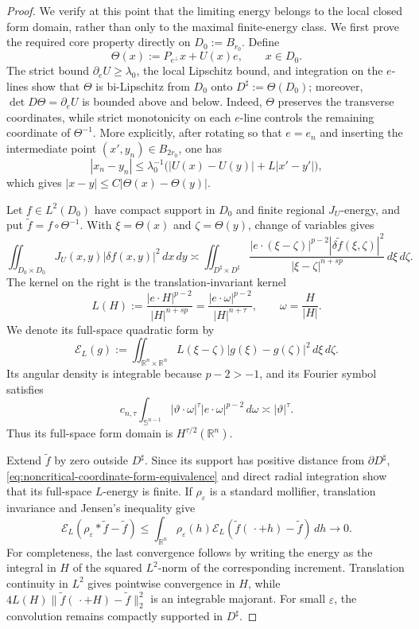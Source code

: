 \documentclass[10pt,a4paper]{amsart}
\newcommand{\R}{\mathbb R}
\newcommand{\dd}{\,d}
\begin{document}
\begin{proof}
We verify at this point that the limiting energy belongs to the local
closed form domain, rather than only to the maximal finite-energy
class.  We first prove the required core property directly on
\(D_0:=B_{r_0}\).  Define
\[
 \Theta(x):=P_{e^\perp}x+U(x)e,
 \qquad x\in D_0.
\]
The strict bound \(\partial_eU\ge\lambda_0\), the local Lipschitz
bound, and integration on the \(e\)-lines show that \(\Theta\) is
bi-Lipschitz from \(D_0\) onto \(D^\sharp:=\Theta(D_0)\); moreover,
\(\det D\Theta=\partial_eU\) is bounded above and below.  Indeed,
\(\Theta\) preserves the transverse coordinates, while strict
monotonicity on each \(e\)-line controls the remaining coordinate of
\(\Theta^{-1}\).  More explicitly, after rotating so that \(e=e_n\)
and inserting the intermediate point \((x',y_n)\in B_{2r_0}\), one has
\[
 |x_n-y_n|\le\lambda_0^{-1}
 \bigl(|U(x)-U(y)|+L|x'-y'|\bigr),
\]
which gives \(|x-y|\le C|\Theta(x)-\Theta(y)|\).

Let \(f\in L^2(D_0)\) have compact support in \(D_0\) and finite
regional \(J_U\)-energy, and put
\(\widetilde f=f\circ\Theta^{-1}\).  With
\(\xi=\Theta(x)\) and \(\zeta=\Theta(y)\), change of variables gives
\begin{equation}
 \iint_{D_0\times D_0}J_U(x,y)|\delta f(x,y)|^2\dd x\!\dd y
 \asymp
 \iint_{D^\sharp\times D^\sharp}
 \frac{|e\cdot(\xi-\zeta)|^{p-2}
       |\delta\widetilde f(\xi,\zeta)|^2}
 {|\xi-\zeta|^{n+sp}}\dd\xi\!\dd\zeta.
 \label{eq:noncritical-coordinate-form-equivalence}
\end{equation}
The kernel on the right is the translation-invariant kernel
\[
 L(H):=\frac{|e\cdot H|^{p-2}}{|H|^{n+sp}}
 =\frac{|e\cdot\omega|^{p-2}}{|H|^{n+\tau}},
 \qquad \omega=\frac H{|H|}.
\]
We denote its full-space quadratic form by
\[
 \mathcal E_L(g):=\iint_{\R^n\times\R^n}
 L(\xi-\zeta)|g(\xi)-g(\zeta)|^2\dd\xi\!\dd\zeta.
\]
Its angular density is integrable because \(p-2>-1\), and its Fourier
symbol satisfies
\[
 c_{n,\tau}\int_{\mathbb S^{n-1}}
 |\vartheta\cdot\omega|^\tau|e\cdot\omega|^{p-2}\dd\omega
 \asymp |\vartheta|^\tau.
\]
Thus its full-space form domain is \(H^{\tau/2}(\R^n)\).

Extend \(\widetilde f\) by zero outside \(D^\sharp\).  Since its
support has positive distance from \(\partial D^\sharp\),
\eqref{eq:noncritical-coordinate-form-equivalence} and direct radial
integration show that its full-space \(L\)-energy is finite.  If
\(\rho_\varepsilon\) is a standard mollifier, translation invariance
and Jensen's inequality give
\[
 \mathcal E_L(\rho_\varepsilon*\widetilde f-\widetilde f)
 \le\int_{\R^n}\rho_\varepsilon(h)
       \mathcal E_L(\widetilde f(\,\cdot+h)-\widetilde f)\dd h
 \longrightarrow0.
\]
For completeness, the last convergence follows by writing the energy
as the integral in \(H\) of the squared \(L^2\)-norm of the
corresponding increment.  Translation continuity in \(L^2\) gives
pointwise convergence in \(H\), while
\(4L(H)\|\widetilde f(\,\cdot+H)-\widetilde f\|_2^2\) is an integrable
majorant.  For small \(\varepsilon\), the convolution remains compactly
supported in \(D^\sharp\).


\end{proof}
\end{document}
